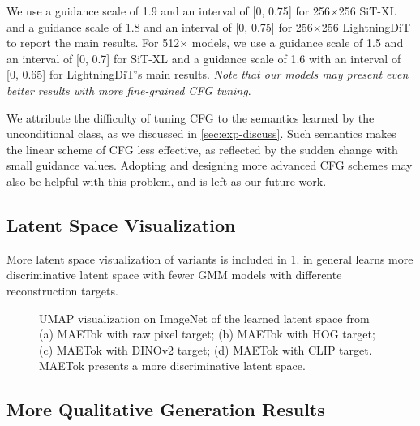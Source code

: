 We use a guidance scale of 1.9 and an interval of {[}0, 0.75{]} for 256$\times$256 SiT-XL and a guidance scale of 1.8 and an interval of {[}0, 0.75{]} for 256$\times$256 LightningDiT to report the main results. 
For 512$\times$ models, we use a guidance scale of 1.5 and an interval of {[}0, 0.7{]} for SiT-XL and a guidance scale of 1.6 with an interval of {[}0, 0.65{]} 
for LightningDiT's main results.
\textit{Note that our models may present even better results with more fine-grained CFG tuning}.

We attribute the difficulty of tuning CFG to the semantics learned by the unconditional class, as we discussed in \cref{sec:exp-discuss}. 
Such semantics makes the linear scheme of CFG less effective, as reflected by the sudden change with small guidance values. 
Adopting and designing more advanced CFG schemes \cite{chung2024cfg++,karras2024guiding} may also be helpful with this problem, and is left as our future work.




\subsection{Latent Space Visualization}
\label{sec:appendix-results-latentvis}

More latent space visualization of \method variants is included in \cref{fig:latent_vis_appendix}.
\method in general learns more discriminative latent space with fewer GMM models with differente reconstruction targets.

\begin{figure}[h!]
\centering
    \hfill
    \hfill
    \hfill
    \hfill
    \hfill
\caption{UMAP visualization on ImageNet of the learned latent space from (a) MAETok with raw pixel target; (b) MAETok with HOG target; (c) MAETok with DINOv2 target; (d) MAETok with CLIP target.
MAETok presents a more discriminative latent space. 
}
\label{fig:latent_vis_appendix}
\end{figure}

\subsection{More Qualitative Generation Results}
\label{sec:appendix-results-gen-vis}


